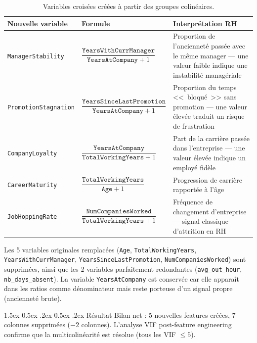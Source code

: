 \documentclass[12pt,a4paper]{article}
\makeatletter
\renewcommand\paragraph{\@startsection{paragraph}{4}{\z@}%
  {1.5ex \@plus 0.5ex \@minus .2ex}%
  {0.5ex \@plus .2ex}%
  {\normalfont\normalsize\bfseries}}
\makeatother
\begin{document}
\begin{table}[ht]
\centering
\begin{tabularx}{\textwidth}{llX}
\toprule
\textbf{Nouvelle variable} & \textbf{Formule} & \textbf{Interprétation RH} \\
\midrule
\texttt{ManagerStability} & $\dfrac{\texttt{YearsWithCurrManager}}{\texttt{YearsAtCompany} + 1}$ & Proportion de l'ancienneté passée avec le même manager --- une valeur faible indique une instabilité managériale \\[6pt]
\texttt{PromotionStagnation} & $\dfrac{\texttt{YearsSinceLastPromotion}}{\texttt{YearsAtCompany} + 1}$ & Proportion du temps <<~bloqué~>> sans promotion --- une valeur élevée traduit un risque de frustration \\[6pt]
\texttt{CompanyLoyalty} & $\dfrac{\texttt{YearsAtCompany}}{\texttt{TotalWorkingYears} + 1}$ & Part de la carrière passée dans l'entreprise --- une valeur élevée indique un employé fidèle \\[6pt]
\texttt{CareerMaturity} & $\dfrac{\texttt{TotalWorkingYears}}{\texttt{Age} + 1}$ & Progression de carrière rapportée à l'âge \\[6pt]
\texttt{JobHoppingRate} & $\dfrac{\texttt{NumCompaniesWorked}}{\texttt{TotalWorkingYears} + 1}$ & Fréquence de changement d'entreprise --- signal classique d'attrition en RH \\
\bottomrule
\end{tabularx}
\caption{Variables croisées créées à partir des groupes colinéaires.}
\end{table}

Les 5 variables originales remplacées (\texttt{Age}, \texttt{TotalWorkingYears}, \texttt{YearsWithCurrManager}, \texttt{YearsSinceLastPromotion}, \texttt{NumCompaniesWorked}) sont supprimées, ainsi que les 2 variables parfaitement redondantes (\texttt{avg\_out\_hour}, \texttt{nb\_days\_absent}). La variable \texttt{YearsAtCompany} est conservée car elle apparaît dans les ratios comme dénominateur mais reste porteuse d'un signal propre (ancienneté brute).

\paragraph{Résultat} Bilan net : 5 nouvelles features créées, 7 colonnes supprimées ($-2$ colonnes). L'analyse VIF post-feature engineering confirme que la multicolinéarité est résolue (tous les VIF $\leq 5$).

\end{document}
